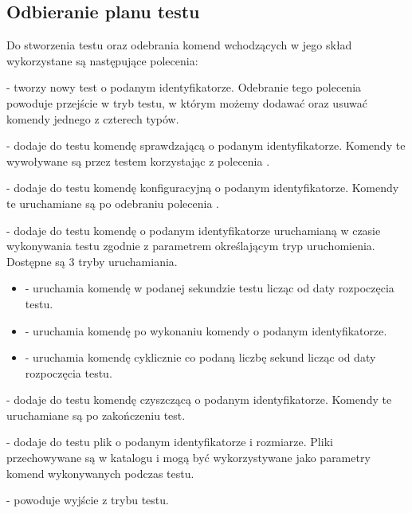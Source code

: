 \documentclass[00-praca-magisterska.tex]{subfiles}
\begin{document}

\subsection{Odbieranie planu testu}

Do stworzenia testu oraz odebrania komend wchodzących w jego skład wykorzystane
są następujące polecenia:

 - tworzy nowy test o podanym
identyfikatorze. Odebranie tego polecenia powoduje przejście w tryb testu, w
którym możemy dodawać oraz usuwać komendy jednego z czterech typów.

 - dodaje do testu komendę
sprawdzającą o podanym identyfikatorze. Komendy te wywoływane są przez testem
korzystając z polecenia .

 - dodaje do testu komendę
konfiguracyjną o podanym identyfikatorze. Komendy te uruchamiane są po odebraniu
polecenia .

 -
dodaje do testu komendę o podanym identyfikatorze uruchamianą w czasie
wykonywania testu zgodnie z parametrem określającym tryp uruchomienia. Dostępne
są 3 tryby uruchamiania.

\begin{itemize} \item{ - uruchamia komendę w podanej
sekundzie testu licząc od daty rozpoczęcia testu.} \item{ - uruchamia komendę po wykonaniu komendy o podanym
identyfikatorze.} \item{ - uruchamia komendę cyklicznie co
podaną liczbę sekund licząc od daty rozpoczęcia testu.} \end{itemize}

 - dodaje do testu komendę
czyszczącą o podanym identyfikatorze. Komendy te uruchamiane są po zakończeniu
test.

 - dodaje do testu
plik o podanym identyfikatorze i rozmiarze. Pliki przechowywane są w katalogu
 i mogą być wykorzystywane jako parametry komend wykonywanych podczas
testu.

 - powoduje wyjście z trybu testu.
\end{document}
